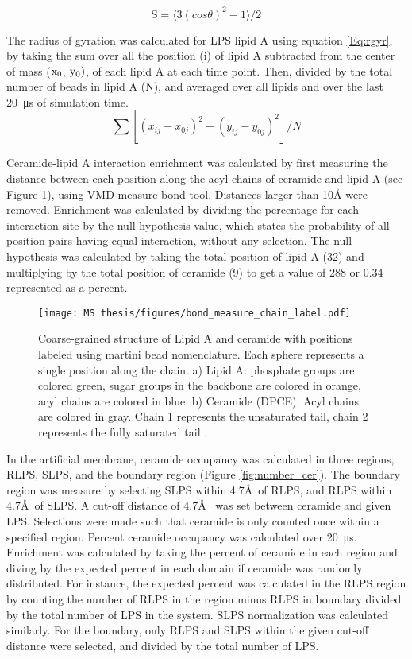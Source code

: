 \documentclass[10pt, letterpaper]{article}
\begin{document}
\begin{equation}
\label{Eq:order}
\mathrm{S} = \langle 3(cos\theta)^2 -1 \rangle /2
\end{equation}

The radius of gyration was calculated for LPS lipid A using equation
\ref{Eq:rgyr}, by taking the sum over all the position (i) of lipid A subtracted from the center of mass ($\rm x_0$, $\rm y_0)$, of each lipid A at each time point. Then, divided by the total number of beads in lipid A (N), and averaged over all lipids and over the last \SI{20}{\micro\second} of simulation time.
\begin{equation}
\label{Eq:rgyr} %
\sum[(x_{ij}-x_{0j})^2+(y_{ij}-y_{0j})^2]/N
\end{equation}

Ceramide-lipid A interaction enrichment was calculated by first measuring the distance between each position along the acyl chains of ceramide and lipid A (see Figure \ref{fig:bond}), using VMD measure bond tool. Distances larger than 10\si{\angstrom} were removed. Enrichment was calculated by dividing the percentage for each interaction site by the null hypothesis value, which states the probability of all position pairs having equal interaction, without any selection. The null hypothesis was calculated by taking the total position of lipid A (32) and multiplying by the total position of ceramide (9) to get a value of 288 or 0.34 represented as a percent.
\begin{figure}[H]
  \centerline{\texttt{[image: MS thesis/figures/bond\_measure\_chain\_label.pdf]}}
  \caption[Coarse-grained ceramide and lipid A structure]{Coarse-grained structure of Lipid A and ceramide with positions labeled using martini bead nomenclature. Each sphere represents a single position along the chain. a) Lipid A: phosphate groups are colored green, sugar groups in the backbone are colored in orange, acyl chains are colored in blue. b) Ceramide (DPCE): Acyl chains are colored in gray. Chain 1 represents the unsaturated tail, chain 2 represents the fully saturated tail \cite{marrink2007martini, hsu2016molecular}. }
  \label{fig:bond}
\end{figure}

In the artificial membrane, ceramide occupancy was calculated in three regions, RLPS, SLPS, and the boundary region (Figure \ref{fig:number_cer}). The boundary region was measure by selecting SLPS within 4.7\AA~of RLPS, and RLPS within 4.7\AA~of SLPS. A cut-off distance of 4.7\AA~ was set between ceramide and given LPS. Selections were made such that ceramide is only counted once within a specified region. Percent ceramide occupancy was calculated over \SI{20}{\micro\second}. Enrichment was calculated by taking the percent of ceramide in each region and diving by the expected percent in each domain if ceramide was randomly distributed. For instance, the expected percent was calculated in the RLPS region by counting the number of RLPS in the region minus RLPS in boundary divided by the total number of LPS in the system. SLPS normalization was calculated similarly. For the boundary, only RLPS and SLPS within the given cut-off distance were selected, and divided by the total number of LPS.
\end{document}

